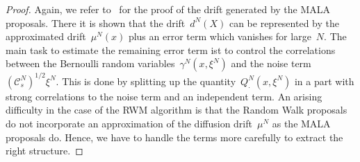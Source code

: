 \begin{proof} 
 Again, we refer to~\autocite[Lemma 4.7]{Pillai2012} for the proof of the drift generated by the MALA proposals. There it is shown that the drift~$d^N(X)$ can be represented by the approximated drift~$\mu^N(x)$ plus an error term which vanishes for large~$N$. The main task to estimate the remaining error term ist to control the correlations between the Bernoulli random variables~$\gamma^N(x, \xi^N)$ and the noise term~$ (\mathcal{C}_s^N)^{1/2} \xi^N$. This is done by splitting up the quantity~$Q^N_{\cdot}(x, \xi^N)$ in a part with strong correlations to the noise term and an independent term.  An arising difficulty in the case of the RWM algorithm is that the Random Walk proposals do not incorporate an approximation of the diffusion drift~$\mu^N$ as the MALA proposals do. Hence, we have to handle the terms more carefully to extract the right structure. 
 

\end{proof}
